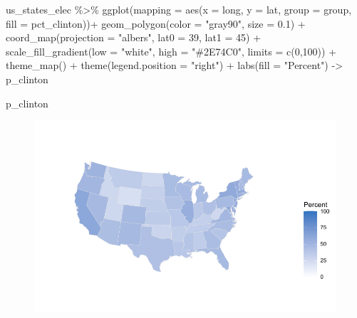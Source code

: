 \documentclass[
  letterpaper,
]{book}
\newenvironment{Shaded}{\begin{snugshade}}{\end{snugshade}}
\newcommand{\AttributeTok}[1]{\textcolor[rgb]{0.40,0.45,0.13}{#1}}
\newcommand{\DecValTok}[1]{\textcolor[rgb]{0.68,0.00,0.00}{#1}}
\newcommand{\FloatTok}[1]{\textcolor[rgb]{0.68,0.00,0.00}{#1}}
\newcommand{\FunctionTok}[1]{\textcolor[rgb]{0.28,0.35,0.67}{#1}}
\newcommand{\NormalTok}[1]{\textcolor[rgb]{0.00,0.23,0.31}{#1}}
\newcommand{\OtherTok}[1]{\textcolor[rgb]{0.00,0.23,0.31}{#1}}
\newcommand{\SpecialCharTok}[1]{\textcolor[rgb]{0.37,0.37,0.37}{#1}}
\newcommand{\StringTok}[1]{\textcolor[rgb]{0.13,0.47,0.30}{#1}}
\begin{document}
\begin{Shaded}
\begin{Highlighting}[]
\NormalTok{us\_states\_elec }\SpecialCharTok{\%\textgreater{}\%}
  \FunctionTok{ggplot}\NormalTok{(}\AttributeTok{mapping =} \FunctionTok{aes}\NormalTok{(}\AttributeTok{x =}\NormalTok{ long, }
                       \AttributeTok{y =}\NormalTok{ lat,}
                       \AttributeTok{group =}\NormalTok{ group,}
                       \AttributeTok{fill =}\NormalTok{ pct\_clinton))}\SpecialCharTok{+}
  \FunctionTok{geom\_polygon}\NormalTok{(}\AttributeTok{color =} \StringTok{"gray90"}\NormalTok{, }\AttributeTok{size =} \FloatTok{0.1}\NormalTok{) }\SpecialCharTok{+}
  \FunctionTok{coord\_map}\NormalTok{(}\AttributeTok{projection =} \StringTok{"albers"}\NormalTok{, }
            \AttributeTok{lat0 =} \DecValTok{39}\NormalTok{, }
            \AttributeTok{lat1 =} \DecValTok{45}\NormalTok{) }\SpecialCharTok{+} 
  \FunctionTok{scale\_fill\_gradient}\NormalTok{(}\AttributeTok{low =} \StringTok{"white"}\NormalTok{, }
                      \AttributeTok{high =} \StringTok{"\#2E74C0"}\NormalTok{,}
                      \AttributeTok{limits =} \FunctionTok{c}\NormalTok{(}\DecValTok{0}\NormalTok{,}\DecValTok{100}\NormalTok{)) }\SpecialCharTok{+} 
  \FunctionTok{theme\_map}\NormalTok{() }\SpecialCharTok{+} \FunctionTok{theme}\NormalTok{(}\AttributeTok{legend.position =} \StringTok{"right"}\NormalTok{) }\SpecialCharTok{+} 
  \FunctionTok{labs}\NormalTok{(}\AttributeTok{fill =} \StringTok{"Percent"}\NormalTok{) }\OtherTok{{-}\textgreater{}}\NormalTok{ p\_clinton}

\NormalTok{p\_clinton}
\end{Highlighting}
\end{Shaded}

\begin{figure}[H]

{\centering \includegraphics{scraping-and-maps_files/figure-pdf/unnamed-chunk-22-1.pdf}

}

\end{figure}
\end{document}
